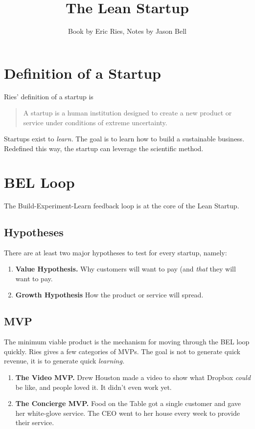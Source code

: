 \documentclass[11pt, oneside]{article}   	%
\title{The Lean Startup}
\author{Book by Eric Ries, Notes by Jason Bell}
\begin{document}
\maketitle
\section{Definition of a Startup}

Ries' definition of a startup is \begin{quote} A startup is a human institution designed to create a new product or service under conditions of extreme uncertainty.  \end{quote}

Startups exist to \textit{learn.}  The goal is to learn how to build a sustainable business.  Redefined this way, the startup can leverage the scientific method.

\section{BEL Loop}

The Build-Experiment-Learn feedback loop is at the core of the Lean Startup.

\subsection{Hypotheses}

There are at least two major hypotheses to test for every startup, namely:
\begin{enumerate}
\item \textbf{Value Hypothesis.}  Why customers will want to pay (and \textit{that} they will want to pay. 
\item \textbf{Growth Hypothesis} How the product or service will spread.
\end{enumerate}

 \subsection{MVP}
 
 The minimum viable product is the mechanism for moving through the BEL loop quickly.  Ries gives a few categories of MVPs.  The goal is not to generate quick revenue, it is to generate quick \textit{learning.}
 
 \begin{enumerate}
 \item \textbf{The Video MVP.} Drew Houston made a video to show what Dropbox \textit{could} be like, and people loved it.  It didn't even work yet.
 \item \textbf{The Concierge MVP.} Food on the Table got a single customer and gave her white-glove service.  The CEO went to her house every week to provide their service.  
 \end{enumerate} 
\end{document}
